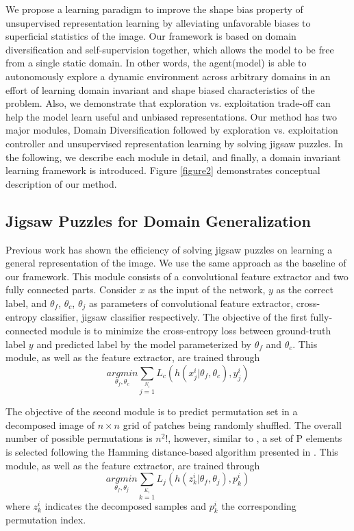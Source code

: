 \documentclass[10pt,twocolumn,letterpaper]{article}
\begin{document}
We propose a learning paradigm to improve the shape bias property of unsupervised representation learning by alleviating unfavorable biases to superficial statistics of the image.
Our framework is based on domain diversification and self-supervision together, which allows the model to be free from a single static domain. In other words, the agent(model) is able to autonomously explore a dynamic environment across arbitrary domains in an effort of learning domain invariant and shape biased characteristics of the problem.
Also, we demonstrate that exploration vs. exploitation trade-off can help the model learn useful and unbiased representations.
Our method has two major modules, Domain Diversification followed by exploration vs. exploitation controller and unsupervised representation learning by solving jigsaw puzzles. In the following, we describe each module in detail, and finally, a domain invariant learning framework is introduced. Figure \ref{figure2} demonstrates conceptual description of our method.

\subsection{Jigsaw Puzzles for Domain Generalization}
Previous work \cite{carlucci2019domain} has shown the efficiency of solving jigsaw puzzles on learning a general representation of the image. We use the same approach as the baseline of our framework.
This module consists of a convolutional feature extractor and two fully connected parts.
Consider $x$ as the input of the network, $y$ as the correct label, and $\theta_f$, $\theta_c$, $\theta_j$ as parameters of convolutional feature extractor, cross-entropy classifier, jigsaw classifier respectively.
The objective of the first fully-connected module is to minimize the cross-entropy loss between ground-truth label $y$ and predicted label by the model parameterized by $\theta_f$ and $\theta_c$. This module, as well as the feature extractor, are trained through
\begin{equation}
\underset{\theta_f, \theta_c}{argmin}
\sum\limits_{j=1}\limits^{N_i}
L_c (h(x_j^i | \theta_f, \theta_c), y_j^i)
\end{equation}

The objective of the second module is to predict permutation set in a decomposed image of $n \times n$ grid of patches being randomly shuffled. The overall number of possible permutations is $n^2!$, however, similar to \cite{carlucci2019domain}, a set of P elements is selected following the Hamming distance-based algorithm presented in \cite{noroozi2016unsupervised}. This module, as well as the feature extractor, are trained through
\begin{equation}
\underset{\theta_f, \theta_j}{argmin}
\sum\limits_{k=1}\limits^{K_i}
L_j (h(z_k^i | \theta_f, \theta_j), p_k^i)
\end{equation}
where $z_k^i$ indicates the decomposed samples and $p_k^i$ the corresponding permutation index.
\end{document}
